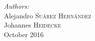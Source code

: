 \begin{titlepage}
\Large \emph{Authors:}\\
Alejandro \textsc{Suárez Hernández}\\ %
Johannes \textsc{Heidecke}\\[3cm] %


{\large October 2016}\\[3cm] %


 

\vspace*{\fill} %

\end{titlepage}
